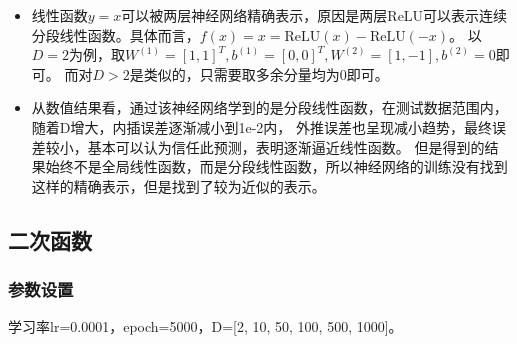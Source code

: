 \documentclass[11pt,a4 paper,one side]{article}
\begin{document}
\begin{itemize}
    \item 线性函数$y=x$可以被两层神经网络精确表示，原因是两层ReLU可以表示连续分段线性函数。具体而言，$f(x)=x=\text{ReLU}(x)-\text{ReLU}(-x)$。
    以$D=2$为例，取$W^{(1)}=[1,1]^T,b^{(1)}=[0,0]^T,W^{(2)}=[1,-1],b^{(2)}=0$即可。
    而对$D>2$是类似的，只需要取多余分量均为0即可。
    \item 从数值结果看，通过该神经网络学到的是分段线性函数，在测试数据范围内，随着D增大，内插误差逐渐减小到1e-2内，
    外推误差也呈现减小趋势，最终误差较小，基本可以认为信任此预测，表明逐渐逼近线性函数。
    但是得到的结果始终不是全局线性函数，而是分段线性函数，所以神经网络的训练没有找到这样的精确表示，但是找到了较为近似的表示。
\end{itemize}

\subsection{二次函数}
\subsubsection{参数设置}
学习率lr=0.0001，epoch=5000，D=[2, 10, 50, 100, 500, 1000]。
\end{document}
